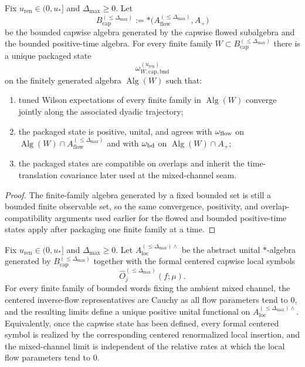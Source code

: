 \begin{corollary}\label{cor:finite-mixed-family}
Fix $u_{\mathrm{ren}}\in(0,u_*]$ and $\Delta_{\max}\ge 0$. Let
\[
B_{\mathrm{cap}}^{(\le \Delta_{\max})}:=\ast\bigl(A_{\mathrm{flow}}^{(\le \Delta_{\max})},A_+\bigr)
\]
be the bounded capwise algebra generated by the capwise flowed subalgebra and the bounded positive-time algebra. For every finite family $W\subset B_{\mathrm{cap}}^{(\le \Delta_{\max})}$ there is a unique packaged state
\[
\omega^{(u_{\mathrm{ren}})}_{W,\mathrm{cap,bnd}}
\]
on the finitely generated algebra $\operatorname{Alg}(W)$ such that:
\begin{enumerate}[label=\textup{(\roman*)},leftmargin=2.25em]
\item tuned Wilson expectations of every finite family in $\operatorname{Alg}(W)$ converge jointly along the associated dyadic trajectory;
\item the packaged state is positive, unital, and agrees with $\omega_{\mathrm{flow}}$ on $\operatorname{Alg}(W)\cap A_{\mathrm{flow}}^{(\le \Delta_{\max})}$ and with $\omega_{\mathrm{bd}}$ on $\operatorname{Alg}(W)\cap A_+$;
\item the packaged states are compatible on overlaps and inherit the time-translation covariance later used at the mixed-channel seam.
\end{enumerate}
\end{corollary}

\begin{proof}
The finite-family algebra generated by a fixed bounded set is still a bounded finite observable set, so the same convergence, positivity, and overlap-compatibility arguments used earlier for the flowed and bounded positive-time states apply after packaging one finite family at a time.
\end{proof}

\begin{theorem}\label{thm:mixed-correlator-closure}
Fix $u_{\mathrm{ren}}\in(0,u_*]$ and $\Delta_{\max}\ge 0$. Let $A_{\mathrm{loc}}^{(\le \Delta_{\max})\wedge}$ be the abstract unital $\ast$-algebra generated by $B_{\mathrm{cap}}^{(\le \Delta_{\max})}$ together with the formal centered capwise local symbols
\[
\widehat O_j^{(\le \Delta_{\max})}(f;\mu).
\]
For every finite family of bounded words fixing the ambient mixed channel, the centered inverse-flow representatives are Cauchy as all flow parameters tend to $0$, and the resulting limits define a unique positive unital functional on $A_{\mathrm{loc}}^{(\le \Delta_{\max})\wedge}$. Equivalently, once the capwise state has been defined, every formal centered symbol is realized by the corresponding centered renormalized local insertion, and the mixed-channel limit is independent of the relative rates at which the local flow parameters tend to $0$.
\end{theorem}

